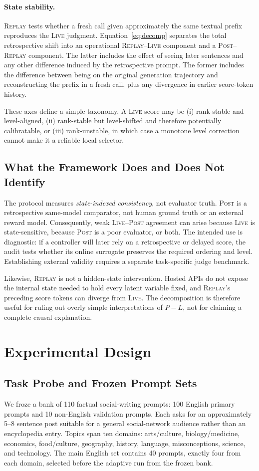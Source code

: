 \documentclass[10pt]{article}
\newcommand{\live}{\textsc{Live}}
\newcommand{\replay}{\textsc{Replay}}
\newcommand{\post}{\textsc{Post}}
\newcommand{\papersection}[1]{\Needspace{4.4\baselineskip}\section{#1}}
\newcommand{\papersubsection}[1]{\Needspace{3.8\baselineskip}\subsection{#1}}
\begin{document}
\paragraph{State stability.}
\replay{} tests whether a fresh call given approximately the same textual prefix reproduces the \live{} judgment. Equation~\ref{eq:decomp} separates the total retrospective shift into an operational \replay{}--\live{} component and a \post{}--\replay{} component. The latter includes the effect of seeing later sentences and any other difference induced by the retrospective prompt. The former includes the difference between being on the original generation trajectory and reconstructing the prefix in a fresh call, plus any divergence in earlier score-token history.

These axes define a simple taxonomy. A \live{} score may be (i) rank-stable and level-aligned, (ii) rank-stable but level-shifted and therefore potentially calibratable, or (iii) rank-unstable, in which case a monotone level correction cannot make it a reliable local selector.

\papersubsection{What the Framework Does and Does Not Identify}
The protocol measures \emph{state-indexed consistency}, not evaluator truth. \post{} is a retrospective same-model comparator, not human ground truth or an external reward model. Consequently, weak \live{}--\post{} agreement can arise because \live{} is state-sensitive, because \post{} is a poor evaluator, or both. The intended use is diagnostic: if a controller will later rely on a retrospective or delayed score, the audit tests whether its online surrogate preserves the required ordering and level. Establishing external validity requires a separate task-specific judge benchmark.

Likewise, \replay{} is not a hidden-state intervention. Hosted APIs do not expose the internal state needed to hold every latent variable fixed, and \replay{}'s preceding score tokens can diverge from \live{}. The decomposition is therefore useful for ruling out overly simple interpretations of $P-L$, not for claiming a complete causal explanation.

\papersection{Experimental Design}
\papersubsection{Task Probe and Frozen Prompt Sets}
We froze a bank of 110 factual social-writing prompts: 100 English primary prompts and 10 non-English validation prompts. Each asks for an approximately 5--8 sentence post suitable for a general social-network audience rather than an encyclopedia entry. Topics span ten domains: arts/culture, biology/medicine, economics, food/culture, geography, history, language, misconceptions, science, and technology. The main English set contains 40 prompts, exactly four from each domain, selected before the adaptive run from the frozen bank.
\end{document}
